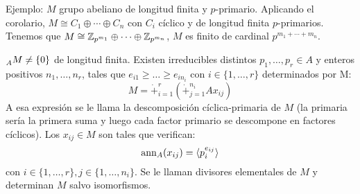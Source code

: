 Ejemplo: \(M\) grupo abeliano de longitud finita y \(p\)-primario.
Aplicando el corolario, \(M\cong C_1\oplus\cdots\oplus C_n\) con
\(C_i\) cíclico y de longitud finita \(p\)-primarios.
Tenemos que \(M\cong \mathbb{Z}_{p^{m_1}}\oplus\cdots\oplus\mathbb{Z}_{p^{m_n}}\),
\(M\) es finito de cardinal \(p^{m_1+\cdots+m_n}\).

\begin{teo}
  \(\prescript{}{A}{M}\neq\{0\}\) de longitud finita. Existen
  irreducibles distintos \(p_1,\ldots,p_r\in A\) y enteros positivos
  \(n_1,\ldots, n_r\), tales que \(e_{i1}\ge\ldots\ge e_{in_i}\) con
  \(i\in\{1,\ldots,r\}\) determinados por M:\@
  \[
    M=\dot{+}_{i=1}^r\left(\dot{+}_{j=1}^{n_i} Ax_{ij}\right)
  \]
  A esa expresión
  se le llama la descomposición cíclica-primaria de \(M\) (la
  primaria sería la primera suma y luego cada factor primario se
  descompone en factores cíclicos).
  Los \(x_{ij}\in M\) son tales que verifican:
  \[
    \operatorname{ann}_A(x_{ij})=\langle p_i^{e_{ij}}\rangle
  \]
  con \(i\in\{1,\ldots,r\}, j\in\{1,\ldots, n_i\}\). Se le llaman
  divisores elementales de \(M\) y
  determinan \(M\) salvo isomorfismos.
\end{teo}
